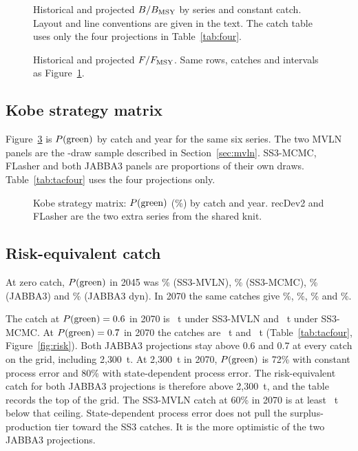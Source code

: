 \documentclass[11pt,a4paper]{article}
\begin{document}
\begin{figure}[H]
  \centering
  \caption{Historical and projected $B/B_{\mathrm{MSY}}$ by series and constant catch.
    Layout and line conventions are given in the text. The catch table uses
    only the four projections in Table~\ref{tab:four}.}
  \label{fig:projb}
\end{figure}

\begin{figure}[H]
  \centering
  \caption{Historical and projected $F/F_{\mathrm{MSY}}$. Same rows, catches and intervals
    as Figure~\ref{fig:projb}.}
  \label{fig:projf}
\end{figure}

\subsection{Kobe strategy matrix}
Figure~\ref{fig:k2sm} is $P(\mathrm{green})$ by catch and year for the same six series.
The two MVLN panels are the \nDraw{}-draw sample described in
Section~\ref{sec:mvln}. SS3-MCMC, FLasher and both JABBA3 panels are
proportions of their own draws. Table~\ref{tab:tacfour} uses the four
projections only.

\begin{figure}[H]
  \centering
  \caption{Kobe strategy matrix: $P(\mathrm{green})$ (\%) by catch and year. recDev2 and
    FLasher are the two extra series from the shared knit.}
  \label{fig:k2sm}
\end{figure}

\subsection{Risk-equivalent catch}
At zero catch, $P(\mathrm{green})$ in 2045 was \greenZeroMvlnFortyFive\% (SS3-MVLN),
\greenZeroMcmcFortyFive\% (SS3-MCMC), \greenZeroJabbaFortyFive\% (JABBA3)
and \greenZeroJabbaDynFortyFive\% (JABBA3 dyn). In 2070 the same catches
give \greenZeroMvlnSeventy\%, \greenZeroMcmcSeventy\%,
\greenZeroJabbaSeventy\% and \greenZeroJabbaDynSeventy\%.

The catch at $P(\mathrm{green}) = 0.6$ in 2070 is \tacMvlnSeventySixty~t under SS3-MVLN
and \tacMcmcSeventySixty~t under SS3-MCMC. At $P(\mathrm{green}) = 0.7$ in 2070 the
catches are \tacMvlnSeventySeventy~t and \tacMcmcSeventySeventy~t
(Table~\ref{tab:tacfour}, Figure~\ref{fig:risk}). Both JABBA3 projections
stay above 0.6 and 0.7 at every catch on the grid, including 2{,}300~t.
At 2{,}300~t in 2070, $P(\mathrm{green})$ is 72\% with constant process error and 80\%
with state-dependent process error. The risk-equivalent catch for both
JABBA3 projections is therefore above 2{,}300~t, and the table records the
top of the grid. The SS3-MVLN catch at 60\% in 2070 is at least
\tacRangeSixtySeventy~t below that ceiling. State-dependent process error
does not pull the surplus-production tier toward the SS3 catches. It is the
more optimistic of the two JABBA3 projections.
\end{document}
